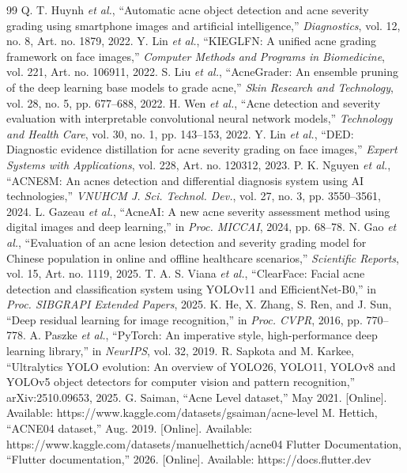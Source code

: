 \documentclass[conference]{IEEEtran}
\begin{document}
\begin{thebibliography}{99}
Q. T. Huynh \emph{et al.}, ``Automatic acne object detection and acne severity grading using smartphone images and artificial intelligence,'' \emph{Diagnostics}, vol. 12, no. 8, Art. no. 1879, 2022.
Y. Lin \emph{et al.}, ``KIEGLFN: A unified acne grading framework on face images,'' \emph{Computer Methods and Programs in Biomedicine}, vol. 221, Art. no. 106911, 2022.
S. Liu \emph{et al.}, ``AcneGrader: An ensemble pruning of the deep learning base models to grade acne,'' \emph{Skin Research and Technology}, vol. 28, no. 5, pp. 677--688, 2022.
H. Wen \emph{et al.}, ``Acne detection and severity evaluation with interpretable convolutional neural network models,'' \emph{Technology and Health Care}, vol. 30, no. 1, pp. 143--153, 2022.
Y. Lin \emph{et al.}, ``DED: Diagnostic evidence distillation for acne severity grading on face images,'' \emph{Expert Systems with Applications}, vol. 228, Art. no. 120312, 2023.
P. K. Nguyen \emph{et al.}, ``ACNE8M: An acnes detection and differential diagnosis system using AI technologies,'' \emph{VNUHCM J. Sci. Technol. Dev.}, vol. 27, no. 3, pp. 3550--3561, 2024.
L. Gazeau \emph{et al.}, ``AcneAI: A new acne severity assessment method using digital images and deep learning,'' in \emph{Proc. MICCAI}, 2024, pp. 68--78.
N. Gao \emph{et al.}, ``Evaluation of an acne lesion detection and severity grading model for Chinese population in online and offline healthcare scenarios,'' \emph{Scientific Reports}, vol. 15, Art. no. 1119, 2025.
T. A. S. Viana \emph{et al.}, ``ClearFace: Facial acne detection and classification system using YOLOv11 and EfficientNet-B0,'' in \emph{Proc. SIBGRAPI Extended Papers}, 2025.
K. He, X. Zhang, S. Ren, and J. Sun, ``Deep residual learning for image recognition,'' in \emph{Proc. CVPR}, 2016, pp. 770--778.
A. Paszke \emph{et al.}, ``PyTorch: An imperative style, high-performance deep learning library,'' in \emph{NeurIPS}, vol. 32, 2019.
R. Sapkota and M. Karkee, ``Ultralytics YOLO evolution: An overview of YOLO26, YOLO11, YOLOv8 and YOLOv5 object detectors for computer vision and pattern recognition,'' arXiv:2510.09653, 2025.
G. Saiman, ``Acne Level dataset,'' May 2021. [Online]. Available: https://www.kaggle.com/datasets/gsaiman/acne-level
M. Hettich, ``ACNE04 dataset,'' Aug. 2019. [Online]. Available: https://www.kaggle.com/datasets/manuelhettich/acne04
Flutter Documentation, ``Flutter documentation,'' 2026. [Online]. Available: https://docs.flutter.dev
\end{thebibliography}
\end{document}
